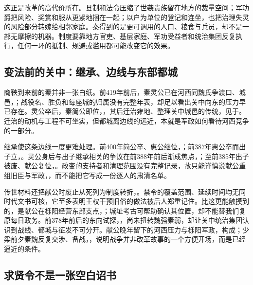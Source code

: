 这正是改革的高代价所在。县制和法令压缩了世袭贵族留在地方的裁量空间；军功爵把风险、奖赏和服从更紧地捆在一起；以户为单位的登记和连坐，也把治理失灵的风险部分转嫁给相邻家庭。秦得到的是更可调用的人口、粮食与兵员，却不是一部无摩擦的机器。制度要靠地方官吏、基层家庭、军功受益者和统治集团反复执行，任何一环的抵制、规避或滥用都可能改变它的效果。

\subsection{变法前的关中：继承、边线与东部都城}

商鞅到来前的秦并非一张白纸。前419年前后，秦灵公已在河西同魏氏争渡口、城邑，；战役名、胜负和每座城的归属没有完整年表，却足以看出关中向东的压力早已存在。灵公卒后，秦简公即位，，其后迁治雍地、整理关中城邑的传统，见于。迁治的动机与工程不可坐实，但都城离边线的远近，本就是军政如何看待河西竞争的一部分。

继承使这条边线一度更难处理。前400年简公卒、惠公继位，；前387年惠公卒而出子立，。灵公身后与出子继承相关的争议在前388年前后渐成焦点，；至前385年出子被废、献公复位，。政变的支持者和清理范围没有完整记录，故只能谨慎说献公重组旧臣与军政，，而不能把它写成一份逐人的肃清名单。

传世材料还把献公时废止从死列为制度转折，。禁令的覆盖范围、延续时间均无同时代文书可核，它至多表明王权干预旧俗的做法被后人郑重记住。比这更能触摸到的，是献公在栎阳经营东部支点，；城址考古可帮助确认其位置，却不能替我们复原每日政务。前378年前后的东向试探，，尚未扭转魏强秦弱，却让关中统治集团认识到战线、都城与征发不可分开。献公晚年留下的河西压力与栎阳军政，构成；少梁前夕秦魏反复交涉、备战，，说明战争并非改革故事的一个方便开场，而是已经逼近的条件。

\subsection{求贤令不是一张空白诏书}

